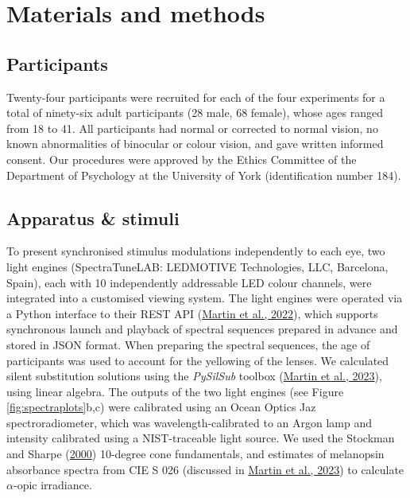 \documentclass[
]{article}
\begin{document}
\hypertarget{materials-and-methods}{%
\section{Materials and methods}\label{materials-and-methods}}

\hypertarget{participants}{%
\subsection{Participants}\label{participants}}

Twenty-four participants were recruited for each of the four experiments for a total of ninety-six adult participants (28 male, 68 female), whose ages ranged from 18 to 41. All participants had normal or corrected to normal vision, no known abnormalities of binocular or colour vision, and gave written informed consent. Our procedures were approved by the Ethics Committee of the Department of Psychology at the University of York (identification number 184).

\hypertarget{apparatus-stimuli}{%
\subsection{Apparatus \& stimuli}\label{apparatus-stimuli}}

To present synchronised stimulus modulations independently to each eye, two light engines (SpectraTuneLAB: LEDMOTIVE Technologies, LLC, Barcelona, Spain), each with 10 independently addressable LED colour channels, were integrated into a customised viewing system. The light engines were operated via a Python interface to their REST API (\protect\hyperlink{ref-Martin2022}{Martin et al., 2022}), which supports synchronous launch and playback of spectral sequences prepared in advance and stored in JSON format. When preparing the spectral sequences, the age of participants was used to account for the yellowing of the lenses. We calculated silent substitution solutions using the \emph{PySilSub} toolbox (\protect\hyperlink{ref-Martin2023}{Martin et al., 2023}), using linear algebra. The outputs of the two light engines (see Figure \ref{fig:spectraplots}b,c) were calibrated using an Ocean Optics Jaz spectroradiometer, which was wavelength-calibrated to an Argon lamp and intensity calibrated using a NIST-traceable light source. We used the Stockman and Sharpe (\protect\hyperlink{ref-Stockman2000}{2000}) 10-degree cone fundamentals, and estimates of melanopsin absorbance spectra from CIE S 026 (discussed in \protect\hyperlink{ref-Martin2023}{Martin et al., 2023}) to calculate \(\alpha\)-opic irradiance.
\end{document}
